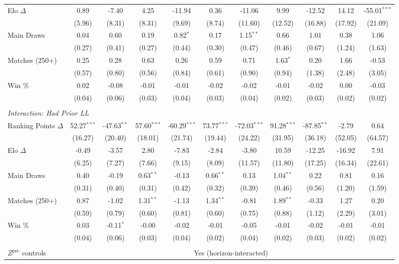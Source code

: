 \begin{tabular}{lcccccccccc}
\quad Elo $\Delta$ & 0.89 & -7.40 & 4.25 & -11.94 & 0.36 & -11.06 & 9.99 & -12.52 & 14.12 & -55.01$^{***}$ \\
 & (5.96) & (8.31) & (8.31) & (9.69) & (8.74) & (11.60) & (12.52) & (16.88) & (17.92) & (21.09) \\[0.3em]
\quad Main Draws & 0.04 & 0.60 & 0.19 & 0.82$^{*}$ & 0.17 & 1.15$^{**}$ & 0.66 & 1.01 & 0.38 & 1.06 \\
 & (0.27) & (0.41) & (0.27) & (0.44) & (0.30) & (0.47) & (0.46) & (0.67) & (1.24) & (1.63) \\[0.3em]
\quad Matches (250+) & 0.25 & 0.28 & 0.63 & 0.26 & 0.59 & 0.71 & 1.63$^{*}$ & 0.20 & 1.66 & -0.53 \\
 & (0.57) & (0.80) & (0.56) & (0.84) & (0.61) & (0.90) & (0.94) & (1.38) & (2.48) & (3.05) \\[0.3em]
\quad Win \% & 0.02 & -0.08 & -0.01 & -0.01 & -0.02 & -0.02 & -0.01 & -0.02 & 0.00 & -0.03 \\
 & (0.04) & (0.06) & (0.03) & (0.04) & (0.03) & (0.04) & (0.02) & (0.03) & (0.02) & (0.02) \\[0.3em]
\\[0.3em]
\multicolumn{11}{l}{\textit{Interaction: Had Prior LL}} \\
\quad Ranking Points $\Delta$ & 52.27$^{***}$ & -47.63$^{**}$ & 57.60$^{***}$ & -60.29$^{***}$ & 73.77$^{***}$ & -72.03$^{***}$ & 91.28$^{***}$ & -87.85$^{**}$ & -2.79 & 0.64 \\
 & (16.27) & (20.40) & (18.01) & (21.74) & (19.44) & (24.22) & (31.95) & (36.18) & (52.05) & (64.57) \\[0.3em]
\quad Elo $\Delta$ & -0.49 & -3.57 & 2.80 & -7.83 & -2.84 & -3.80 & 10.59 & -12.25 & -16.92 & 7.91 \\
 & (6.25) & (7.27) & (7.66) & (9.15) & (8.09) & (11.57) & (11.80) & (17.25) & (16.34) & (22.61) \\[0.3em]
\quad Main Draws & 0.40 & -0.19 & 0.63$^{**}$ & -0.13 & 0.66$^{**}$ & 0.13 & 1.04$^{**}$ & 0.22 & 0.81 & 0.16 \\
 & (0.31) & (0.40) & (0.31) & (0.42) & (0.32) & (0.39) & (0.46) & (0.56) & (1.20) & (1.59) \\[0.3em]
\quad Matches (250+) & 0.87 & -1.02 & 1.31$^{**}$ & -1.13 & 1.34$^{**}$ & -0.81 & 1.89$^{**}$ & -0.33 & 1.27 & 0.20 \\
 & (0.59) & (0.79) & (0.60) & (0.81) & (0.60) & (0.75) & (0.88) & (1.12) & (2.29) & (3.01) \\[0.3em]
\quad Win \% & 0.03 & -0.11$^{*}$ & -0.00 & -0.02 & -0.01 & -0.05 & -0.01 & -0.02 & -0.01 & -0.01 \\
 & (0.04) & (0.06) & (0.03) & (0.04) & (0.02) & (0.04) & (0.02) & (0.03) & (0.02) & (0.02) \\[0.3em]
\\[0.3em]
\midrule
$Z^{\text{pre}}$ controls & \multicolumn{10}{c}{Yes (horizon-interacted)} \\
\bottomrule
\end{tabular}
